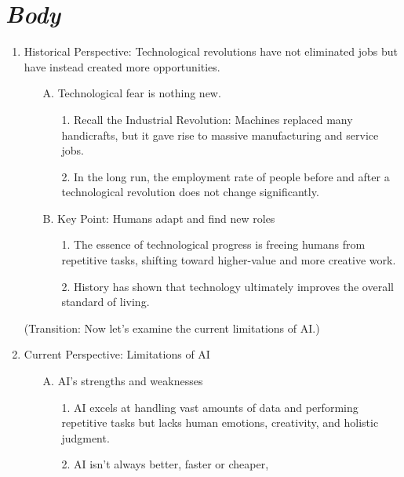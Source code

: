 \documentclass{article}
\begin{document}
\section{\textit{Body}}
\begin{enumerate}
      \renewcommand{\labelenumi}{\Roman{enumi}.} 
      \item Historical Perspective: Technological revolutions 
      have not eliminated jobs but have instead created more opportunities.
      \begin{enumerate}
            \item[A.] Technological fear is nothing new.
            \begin{enumerate}
                  \item[1.] Recall the Industrial Revolution: 
                  Machines replaced many handicrafts, but it gave rise 
                  to massive manufacturing and service jobs.
                  \item[2.] In the long run, the employment rate of people 
                  before and after a technological revolution does not change
                   significantly.
            \end{enumerate}
            \item[B.]  Key Point: Humans adapt and find new roles
            \begin{enumerate}
                  \item[1.] The essence of technological progress is 
                  freeing humans from repetitive tasks, shifting toward 
                  higher-value and more creative work.
                  \item[2.] History has shown that technology ultimately 
                  improves the overall standard of living. 
            \end{enumerate}
      \end{enumerate}
      (Transition: Now let's examine the current limitations of AI.)
      \item Current Perspective: Limitations of AI
      \begin{enumerate}
            \item[A.] AI's strengths and weaknesses
            \begin{enumerate}
                  \item[1.] AI excels at handling vast amounts of 
                  data and performing repetitive tasks but lacks human 
                  emotions, creativity, and holistic judgment. 
                  \item[2.] AI isn’t always better, faster or cheaper,

\end{enumerate}
\end{enumerate}
\end{enumerate}
\end{document}
